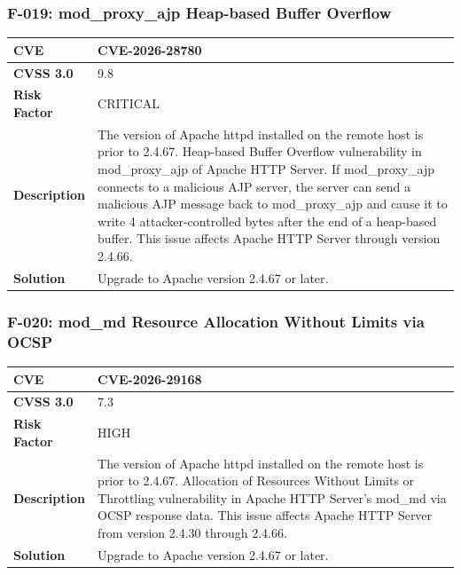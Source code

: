 \subsubsection{F-019: mod\_proxy\_ajp Heap-based Buffer Overflow}
\begin{tabular}{|p{2.8cm}|p{12.2cm}|}
\hline
\textbf{CVE} & CVE-2026-28780 \\ \hline
\textbf{CVSS 3.0} & 9.8 \\ \hline
\textbf{Risk Factor} & CRITICAL \\ \hline
\textbf{Description} & The version of Apache httpd installed on the remote host is prior to 2.4.67. Heap-based Buffer Overflow vulnerability in mod\_proxy\_ajp of Apache HTTP Server. If mod\_proxy\_ajp connects to a malicious AJP server, the server can send a malicious AJP message back to mod\_proxy\_ajp and cause it to write 4 attacker-controlled bytes after the end of a heap-based buffer. This issue affects Apache HTTP Server through version 2.4.66. \\ \hline
\textbf{Solution} & Upgrade to Apache version 2.4.67 or later. \\ \hline
\end{tabular}

\subsubsection{F-020: mod\_md Resource Allocation Without Limits via OCSP}
\begin{tabular}{|p{2.8cm}|p{12.2cm}|}
\hline
\textbf{CVE} & CVE-2026-29168 \\ \hline
\textbf{CVSS 3.0} & 7.3 \\ \hline
\textbf{Risk Factor} & HIGH \\ \hline
\textbf{Description} & The version of Apache httpd installed on the remote host is prior to 2.4.67. Allocation of Resources Without Limits or Throttling vulnerability in Apache HTTP Server's mod\_md via OCSP response data. This issue affects Apache HTTP Server from version 2.4.30 through 2.4.66. \\ \hline
\textbf{Solution} & Upgrade to Apache version 2.4.67 or later. \\ \hline
\end{tabular}

